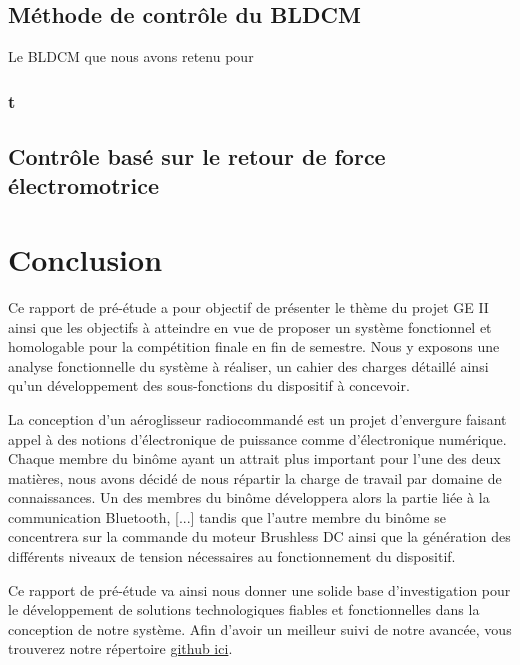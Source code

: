 \documentclass[a4paper,12pt]{book}
\begin{document}
				 \subsection{Méthode de contrôle du BLDCM}
				 
				 Le BLDCM que nous avons retenu pour 
				 
				 	\subsubsection{t}
				 
				 
				 
				 
				 
				 
				 
				 
				 

			
			\subsection{Contrôle basé sur le retour de force électromotrice}
	

	
	\section{Conclusion}
	
	Ce rapport de pré-étude a pour objectif de présenter le thème du projet GE II ainsi que les objectifs à atteindre en vue de proposer un système fonctionnel et homologable pour la compétition finale en fin de semestre. Nous y exposons une analyse fonctionnelle du système à réaliser, un cahier des charges détaillé ainsi qu'un développement des sous-fonctions du dispositif à concevoir.
	
	La conception d'un aéroglisseur radiocommandé est un projet d'envergure faisant appel à des notions d'électronique de puissance comme d'électronique numérique. Chaque membre du binôme ayant un attrait plus important pour l'une des deux matières, nous avons décidé de nous répartir la charge de travail par domaine de connaissances. Un des membres du binôme développera alors la partie liée à la communication Bluetooth, [...] tandis que l'autre membre du binôme se concentrera sur la commande du moteur Brushless DC ainsi que la génération des différents niveaux de tension nécessaires au fonctionnement du dispositif.
	
	Ce rapport de pré-étude va ainsi nous donner une solide base d'investigation pour le développement de solutions technologiques fiables et fonctionnelles dans la conception de notre système. Afin d'avoir un meilleur suivi de notre avancée, vous trouverez notre répertoire \href{https://github.com/tristanplouz/ProjetGE2}{github ici}.
	
	\listoffigures
	
	 
	
	
\end{document}
